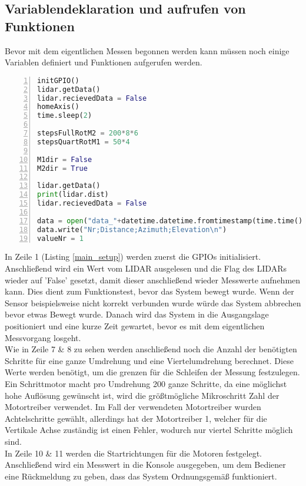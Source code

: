 \subsection{Variablendeklaration und aufrufen von Funktionen}
Bevor mit dem eigentlichen Messen begonnen werden kann müssen noch einige Variablen definiert und Funktionen aufgerufen werden.
\begin{lstlisting}[caption={Aufrufen von Funktionen und Variablen deklaration}, language={Python}, label={main_setup}, numbers=left]
initGPIO()
lidar.getData()
lidar.recievedData = False
homeAxis()
time.sleep(2)

stepsFullRotM2 = 200*8*6
stepsQuartRotM1 = 50*4

M1dir = False
M2dir = True

lidar.getData()
print(lidar.dist)
lidar.recievedData = False

data = open("data_"+datetime.datetime.fromtimestamp(time.time()).strftime('%Y-%m-%d_%H-%M-%S')+".csv", "w")
data.write("Nr;Distance;Azimuth;Elevation\n")
valueNr = 1
\end{lstlisting}
In Zeile 1 (Listing \ref{main_setup}) werden zuerst die \acp{GPIO} initialisiert. Anschließend wird ein Wert vom \ac{LIDAR} ausgelesen  und die Flag des \acp{LIDAR} wieder auf 'False' gesetzt, damit dieser anschließend wieder Messwerte aufnehmen kann. Dies dient zum Funktionstest, bevor das System bewegt wurde. Wenn der Sensor beispielsweise nicht korrekt verbunden wurde würde das System abbrechen bevor etwas Bewegt wurde. Danach wird das System in die Ausgangslage positioniert und eine kurze Zeit gewartet, bevor es mit dem eigentlichen Messvorgang losgeht.\\
Wie in Zeile 7 \& 8 zu sehen werden anschließend noch die Anzahl der benötigten Schritte für eine ganze Umdrehung und eine Viertelumdrehung berechnet. Diese Werte werden benötigt, um die grenzen für die Schleifen der Messung festzulegen. Ein Schrittmotor macht pro Umdrehung 200 ganze Schritte, da eine möglichst hohe Auflösung gewünscht ist, wird die größtmögliche Mikroschritt Zahl der Motortreiber verwendet. Im Fall der verwendeten Motortreiber wurden Achtelschritte gewählt, allerdings hat der Motortreiber 1, welcher für die Vertikale Achse zuständig ist einen Fehler, wodurch nur viertel Schritte möglich sind.\\
In Zeile 10 \& 11 werden die Startrichtungen für die Motoren festgelegt.\\
Anschließend wird ein Messwert in die Konsole ausgegeben, um dem Bediener eine Rückmeldung zu geben, dass das System Ordnungsgemäß funktioniert.\\
